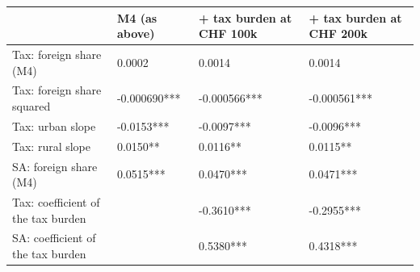 \begin{tabular}{llll}
\toprule
 & M4 (as above) & + tax burden at CHF 100k & + tax burden at CHF 200k \\
\midrule
Tax: foreign share (M4) & 0.0002 & 0.0014 & 0.0014 \\
Tax: foreign share squared & -0.000690*** & -0.000566*** & -0.000561*** \\
Tax: urban slope & -0.0153*** & -0.0097*** & -0.0096*** \\
Tax: rural slope & 0.0150** & 0.0116** & 0.0115** \\
SA: foreign share (M4) & 0.0515*** & 0.0470*** & 0.0471*** \\
Tax: coefficient of the tax burden &  & -0.3610*** & -0.2955*** \\
SA: coefficient of the tax burden &  & 0.5380*** & 0.4318*** \\
\bottomrule
\end{tabular}
